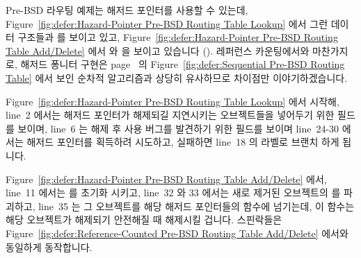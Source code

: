 Pre-BSD 라우팅 예제는 해저드 포인터를 사용할 수 있는데,
Figure~\ref{fig:defer:Hazard-Pointer Pre-BSD Routing Table Lookup}
에서 그런 데이터 구조들과  를 보이고 있고,
Figure~\ref{fig:defer:Hazard-Pointer Pre-BSD Routing Table Add/Delete}
에서  와  을 보이고 있습니다
().
레퍼런스 카운팅에서와 마찬가지로, 해저드 퐁니터 구현은
page~\pageref{fig:defer:Sequential Pre-BSD Routing Table} 의
Figure~\ref{fig:defer:Sequential Pre-BSD Routing Table} 에서 보인 순차적
알고리즘과 상당히 유사하므로 차이점만 이야기하겠습니다.

Figure~\ref{fig:defer:Hazard-Pointer Pre-BSD Routing Table Lookup} 에서 시작해,
line~2 에서는 해저드 포인터가 해제되길 지연시키는 오브젝트들을 넣어두기 위한
 필드를 보이며, line~6 는 해제 후 사용 버그를 발견하기 위한
 필드를 보이며 line~24-30 에서는 해저드 포인터를 획득하려
시도하고, 실패하면 line~18 의  라벨로 브랜치 하게 됩니다.

Figure~\ref{fig:defer:Hazard-Pointer Pre-BSD Routing Table Add/Delete}
에서, line~11 에서는  를 초기화 시키고, line~32 와 33 에서는
새로 제거된 오브젝트의  를 파괴하고, line~35 는 그 오브젝트를
해당 해저드 포인터들의  함수에 넘기는데, 이 함수는 해당
오브젝트가 해제되기 안전해질 때 해제시킬 겁니다.
스핀락들은
Figure~\ref{fig:defer:Reference-Counted Pre-BSD Routing Table Add/Delete}
에서와 동일하게 동작합니다.
\iffalse

